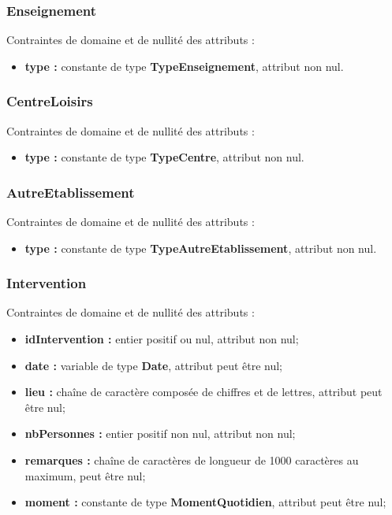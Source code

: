 \subsubsection*{Enseignement}
Contraintes de domaine et de nullité des attributs :
\begin{itemize}
	\item \textbf{type :} constante de type \textbf{TypeEnseignement}, attribut non nul.\\
\end{itemize}

\subsubsection*{CentreLoisirs}
Contraintes de domaine et de nullité des attributs :
\begin{itemize}
	\item \textbf{type :} constante de type \textbf{TypeCentre}, attribut non nul.\\
\end{itemize}

\subsubsection*{AutreEtablissement}
Contraintes de domaine et de nullité des attributs :
\begin{itemize}
	\item \textbf{type :} constante de type \textbf{TypeAutreEtablissement}, attribut non nul.\\
\end{itemize}

\subsubsection*{Intervention} 
Contraintes de domaine et de nullité des attributs :
\begin{itemize}
 	\item \textbf{idIntervention :} entier positif ou nul, attribut non nul;
	\item \textbf{date :} variable de type \textbf{Date}, attribut peut être nul;
	\item \textbf{lieu :} chaîne de caractère composée de chiffres et de lettres, attribut peut être nul;
	\item \textbf{nbPersonnes :} entier positif non nul, attribut non nul;  
	\item \textbf{remarques :} chaîne de caractères de longueur de 1000 caractères au maximum, peut être nul;
	\item \textbf{moment :} constante de type \textbf{MomentQuotidien}, attribut peut être nul;\\
\end{itemize}  

